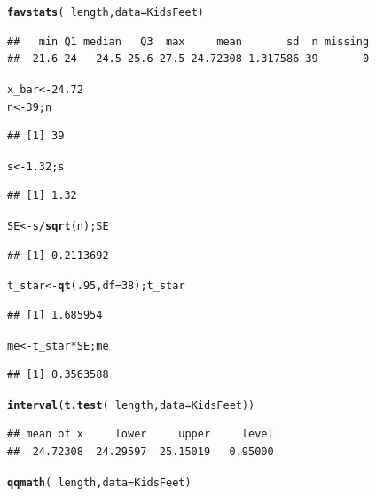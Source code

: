 \documentclass[twoside]{book}\usepackage[]{graphicx}\usepackage[]{xcolor}
\makeatletter
\newcommand{\hlnum}[1]{\textcolor[rgb]{0.686,0.059,0.569}{#1}}%
\newcommand{\hlopt}[1]{\textcolor[rgb]{0,0,0}{#1}}%
\newcommand{\hlstd}[1]{\textcolor[rgb]{0.345,0.345,0.345}{#1}}%
\newcommand{\hlkwb}[1]{\textcolor[rgb]{0.69,0.353,0.396}{#1}}%
\newcommand{\hlkwc}[1]{\textcolor[rgb]{0.333,0.667,0.333}{#1}}%
\newcommand{\hlkwd}[1]{\textcolor[rgb]{0.737,0.353,0.396}{\textbf{#1}}}%
\newenvironment{kframe}{%
 \def\at@end@of@kframe{}%
 \ifinner\ifhmode%
  \def\at@end@of@kframe{\end{minipage}}%
  \begin{minipage}{\columnwidth}%
 \fi\fi%
 \def\FrameCommand##1{\hskip\@totalleftmargin \hskip-\fboxsep
 \colorbox{shadecolor}{##1}\hskip-\fboxsep
     \hskip-\linewidth \hskip-\@totalleftmargin \hskip\columnwidth}%
 \MakeFramed {\advance\hsize-\width
   \@totalleftmargin\z@ \linewidth\hsize
   \@setminipage}}%
 {\par\unskip\endMakeFramed%
 \at@end@of@kframe}
\newenvironment{knitrout}{}{} %
\makeatother
\begin{document}
\begin{solution}
\begin{knitrout}
\color{fgcolor}\begin{kframe}
\begin{alltt}
\hlkwd{favstats}\hlstd{(} \hlopt{~} \hlstd{length,} \hlkwc{data}\hlstd{=KidsFeet )}
\end{alltt}
\begin{verbatim}
##   min Q1 median   Q3  max     mean       sd  n missing
##  21.6 24   24.5 25.6 27.5 24.72308 1.317586 39       0
\end{verbatim}
\begin{alltt}
\hlstd{x_bar} \hlkwb{<-} \hlnum{24.72}
\hlstd{n} \hlkwb{<-} \hlnum{39}\hlstd{; n}
\end{alltt}
\begin{verbatim}
## [1] 39
\end{verbatim}
\begin{alltt}
\hlstd{s} \hlkwb{<-} \hlnum{1.32}\hlstd{; s}
\end{alltt}
\begin{verbatim}
## [1] 1.32
\end{verbatim}
\begin{alltt}
\hlstd{SE} \hlkwb{<-} \hlstd{s} \hlopt{/} \hlkwd{sqrt}\hlstd{(n) ; SE}
\end{alltt}
\begin{verbatim}
## [1] 0.2113692
\end{verbatim}
\begin{alltt}
\hlstd{t_star} \hlkwb{<-} \hlkwd{qt}\hlstd{(} \hlnum{.95}\hlstd{,} \hlkwc{df}\hlstd{=}\hlnum{38} \hlstd{) ; t_star}
\end{alltt}
\begin{verbatim}
## [1] 1.685954
\end{verbatim}
\begin{alltt}
\hlstd{me} \hlkwb{<-} \hlstd{t_star} \hlopt{*} \hlstd{SE; me}
\end{alltt}
\begin{verbatim}
## [1] 0.3563588
\end{verbatim}
\begin{alltt}
\hlkwd{interval}\hlstd{(} \hlkwd{t.test}\hlstd{(} \hlopt{~}\hlstd{length,} \hlkwc{data}\hlstd{=KidsFeet) )}
\end{alltt}
\begin{verbatim}
## mean of x     lower     upper     level 
##  24.72308  24.29597  25.15019   0.95000
\end{verbatim}
\begin{alltt}
\hlkwd{qqmath}\hlstd{(} \hlopt{~}\hlstd{length,} \hlkwc{data}\hlstd{=KidsFeet )}
\end{alltt}
\end{kframe}


\end{knitrout}
\end{solution}
\end{document}

